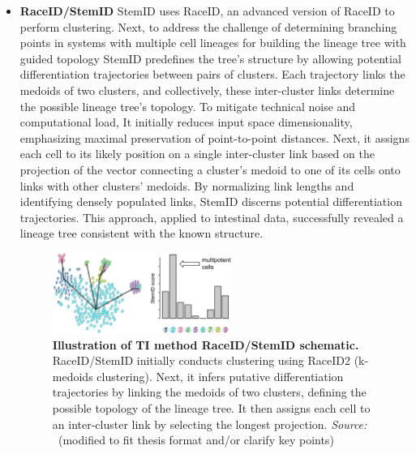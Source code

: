 \begin{itemize}
    \item \textbf{RaceID/StemID}
    StemID\citep{grun2016stemid} uses RaceID\citep{grun2015raceid}, an advanced version of RaceID to perform clustering. Next, to address the challenge of determining branching points in systems with multiple cell lineages for building the lineage tree with guided topology StemID predefines the tree's structure by allowing potential differentiation trajectories between pairs of clusters. Each trajectory links the medoids of two clusters, and collectively, these inter-cluster links determine the possible lineage tree's topology. To mitigate technical noise and computational load, It initially reduces input space dimensionality, emphasizing maximal preservation of point-to-point distances. Next, it assigns each cell to its likely position on a single inter-cluster link based on the projection of the vector connecting a cluster's medoid to one of its cells onto links with other clusters' medoids. By normalizing link lengths and identifying densely populated links, StemID discerns potential differentiation trajectories. This approach, applied to intestinal data, successfully revealed a lineage tree consistent with the known structure.
    \begin{figure}[ht!]
    	\centering
    	\includegraphics[width=0.55\textwidth]{TI_Alg_StemID/fig}
    	\vspace{0.1cm}
    	\caption[Illustration of TI method RaceID/StemID schematic.]{\textbf{Illustration of TI method RaceID/StemID schematic.} 
    	RaceID/StemID initially conducts clustering using RaceID2 (k-medoids clustering). Next, it infers putative differentiation trajectories by linking the medoids of two clusters, defining the possible topology of the lineage tree. It then assigns each cell to an inter-cluster link by selecting the longest projection. \emph{Source: ~\cite{albergante2020ElPiGraph}}(modified to fit thesis format and/or clarify key points)
    	}
    	\label{fig:TI_Alg_StemID}
    \end{figure}



\end{itemize}
